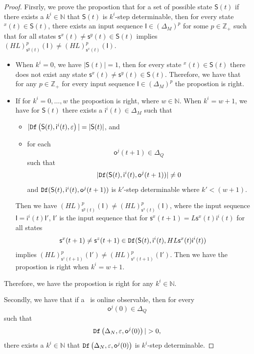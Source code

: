 \begin{proof} Firsrly, we prove the propostion that for a set of possible state $\mathsf{S}(t)$ if there exists a $k^{i}\in \mathbb{N}$ that $\mathsf{S}(t)$ is $k^{i}$-step determinable, then for every state \State$^{x}(t)$$\in \mathsf{S}(t)$, there exists an input sequence $\mathsf{I}\in(\Delta_M)^p$ for some $p\in \mathbb{Z}_+$ such that for all states $\mathsf{s}^{x}(t)\neq \mathsf{s}^{y}(t)\in \mathsf{S}(t)$ implies $(HL)^p_{\mathsf{s}^{y}(t)}(\mathsf{I})\neq (HL)^p_{{\mathsf{s}^{x}(t)}}(\mathsf{I})$.
\begin{itemize}
\item When $k^{i}=0$, we have $|\mathsf{S}(t)|=1$, then for every state \State$^{x}(t)$$\in \mathsf{S}(t)$ there does not exist any state $\mathsf{s}^{x}(t)\neq \mathsf{s}^{y}(t)\in \mathsf{S}(t)$. Therefore, we have that for any $p\in \mathbb{Z}_+$ for every input sequence $\mathsf{I}\in(\Delta_M)^p$ the propostion is right. 
\item If for $k^{i}=0,\ldots, w$ the propostion is right, where $w\in\mathbb{N}$. When $k^{i}=w+1$, we have for $\mathsf{S}(t)$ there exists a $\mathsf{i}^{i}(t)\in \Delta_M$ such that
 \begin{itemize}
 \item  $|{\tt Df}\left(\mathsf{S}(t),\mathsf{i}^{i}(t),\varepsilon\right)|=|\mathsf{S}(t)|$, and 
 \item  for each \[\mathsf{o}^{j}(t+1)\in \Delta_Q\] such that \[|{\tt Df}(\mathsf{S}(t),\mathsf{i}^{i}(t),\mathsf{o}^{j}(t+1))|\neq 0\] and ${\tt Df}(\mathsf{S}(t),\mathsf{i}^{i}(t),\mathsf{o}^{j}(t+1))$ is $k'$-step determinable where ${k'}<(w+1)$.
 \end{itemize}
 Then we have $(HL)^p_{\mathsf{s}^{y}(t)}(\mathsf{I})\neq (HL)^p_{{\mathsf{s}^{x}(t)}}(\mathsf{I})$, where the input sequence $\mathsf{I}=\mathsf{i}^{i}(t)\mathsf{I}'$, $\mathsf{I}'$ is the input sequence that for $\mathsf{s}^{x}(t+1)=L\mathsf{s}^{x}(t)\mathsf{i}^{i}(t)$ for all states \[\mathsf{s}^{x}(t+1)\neq \mathsf{s}^{z}(t+1)\in {\tt Df}(\mathsf{S}(t),\mathsf{i}^{i}(t),HL\mathsf{s}^{x}(t)\mathsf{i}^{i}(t))\] implies $(HL)^p_{\mathsf{s}^{z}(t+1)}(\mathsf{I}')\neq (HL)^p_{{\mathsf{s}^{x}(t+1)}}(\mathsf{I}')$.
Then we have the propostion is right when $k^{i}=w+1$.
\end{itemize}
Therefore, we have the propostion is right for any $k^{i}\in \mathbb{N}$.

Secondly, we have that if a \BCN\ is online observable,
then for every  \[\mathsf{o}^{j}(0)\in \Delta_Q\] such that \[\Ded\left(\Delta_N,\varepsilon, \mathsf{o}^{j}(0)\right)|> 0,\] there exists a $k^{i}\in \mathbb{N}$ that ${\tt Df}\left(\Delta_N,\varepsilon,\mathsf{o}^{j}(0)\right)$ is $k^{i}$-step determinable. 


\end{proof}
